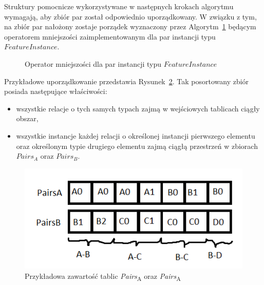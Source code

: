 \documentclass[12pt]{article}
\begin{document}
Struktury pomocnicze wykorzystywane w następnych krokach algorytmu wymagają, aby zbiór par został odpowiednio uporządkowany. W związku z tym, na zbiór par nałożony zostaje porządek wyznaczony przez Algorytm~\ref{alg:FeatureInstancePair-operator} będącym operatorem mniejszości zaimplementowanym dla par instancji typu $ FeatureInstance $.

\begin{figure}[H]
\begin{algorithm}[H]
\caption{Operator mniejszości dla par instancji typu $ FeatureInstance $}
\label{alg:FeatureInstancePair-operator}
\end{algorithm}
\end{figure}

Przykładowe uporządkowanie przedstawia Rysunek~\ref{fig:pairs_content}. Tak posortowany zbiór posiada następujące właściwości:
\begin{itemize}
\item wszystkie relacje o tych samych typach zajmą w wejściowych tablicach ciągły obszar,
\item wszystkie instancje każdej relacji o określonej instancji pierwszego elementu oraz określonym typie drugiego elementu zajmą ciągłą przestrzeń w zbiorach $ Pairs_{A} $ oraz $ Pairs_{B} $.
\end{itemize}

\begin{figure}[H]
\centering
\includegraphics{sortAttr_insTable}
\caption{Przykładowa zawartość tablic \textit{Pairs}\textsubscript{A} oraz \textit{Pairs}\textsubscript{A}}
\label{fig:pairs_content}
\end{figure}
\end{document}
